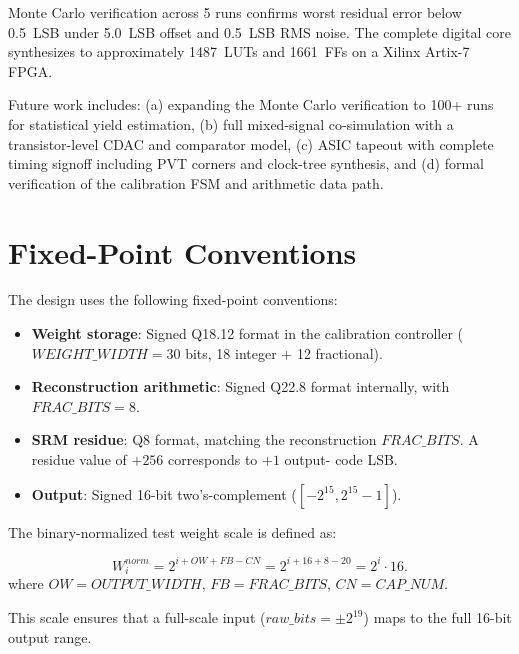 \documentclass[journal]{IEEEtran}
\begin{document}
Monte Carlo verification across 5 runs confirms worst residual error below
0.5~LSB under 5.0~LSB offset and 0.5~LSB RMS noise. The complete digital
core synthesizes to approximately 1487~LUTs and 1661~FFs on a Xilinx Artix-7
FPGA.

Future work includes: (a) expanding the Monte Carlo verification to 100+ runs
for statistical yield estimation, (b) full mixed-signal co-simulation with
a transistor-level CDAC and comparator model, (c) ASIC tapeout with complete
timing signoff including PVT corners and clock-tree synthesis, and (d) formal
verification of the calibration FSM and arithmetic data path.

\appendices
\section{Fixed-Point Conventions}

The design uses the following fixed-point conventions:

\begin{itemize}
    \item \textbf{Weight storage}: Signed Q18.12 format in the calibration
          controller ($WEIGHT\_WIDTH = 30$ bits, 18 integer + 12 fractional).
    \item \textbf{Reconstruction arithmetic}: Signed Q22.8 format internally,
          with $FRAC\_BITS = 8$.
    \item \textbf{SRM residue}: Q8 format, matching the reconstruction
          $FRAC\_BITS$. A residue value of $+256$ corresponds to $+1$ output-
          code LSB.
    \item \textbf{Output}: Signed 16-bit two's-complement ($[-2^{15},
          2^{15}-1]$).
\end{itemize}

The binary-normalized test weight scale is defined as:

\begin{equation}
W_i^{norm} = 2^{i + OW + FB - CN} = 2^{i + 16 + 8 - 20} = 2^i \cdot 16.
\label{eq:norm_weight}
\end{equation}
where $OW = OUTPUT\_WIDTH$, $FB = FRAC\_BITS$, $CN = CAP\_NUM$.

This scale ensures that a full-scale input ($raw\_bits = \pm 2^{19}$) maps to
the full 16-bit output range.
\end{document}
